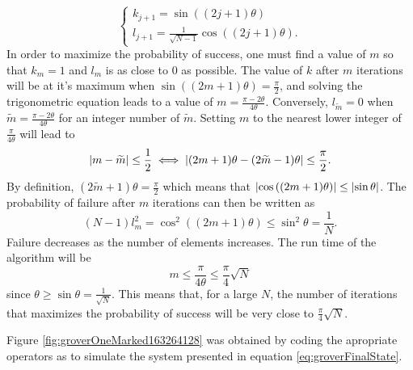 \documentclass[../../dissertation.tex]{subfiles}
\begin{document}
\begin{equation}
	\begin{cases}
		k_{j+1} = \sin{((2j+1)\theta)} 
		\\l_{j+1} = \frac{1}{\sqrt{N-1}}\cos{((2j+1)\theta)}.
	\end{cases}\label{eq:groverKandJ2}
\end{equation}
In order to maximize the probability of success, one must find a value of $m$ so that $k_m = 1$ and $l_m$ is as close to $0$ as possible. The value of $k$ after $m$ iterations will be at it's maximum when $\sin{((2m+1)\theta)} = \frac{\pi}{2}$, and solving the trigonometric equation leads to a value of $m = \frac{\pi-2\theta}{4\theta}$. Conversely, $l_{\widetilde{m}} = 0$ when $\widetilde{m} = \frac{\pi-2\theta}{4\theta}$ for an integer number of $\widetilde{m}$. Setting $m$ to the nearest lower integer of $\frac{\pi}{4\theta}$ will lead to
\begin{equation}
	\abs{m-\widetilde{m}} \leq \frac{1}{2} \iff \abs{(2m+1)\theta - (2\widetilde{m}-1)\theta} \leq \frac{\pi}{2}.
\end{equation}
By definition, $(2\widetilde{m}+1)\theta = \frac{\pi}{2}$ which means that $\abs{\cos{((2m+1)}\theta)} \leq \abs{\sin{\theta}}$. The probability of failure after $m$ iterations can then be written as
\begin{equation}
	(N-1)l_m^2 = \cos^2{((2m+1)\theta)} \leq \sin^2\theta = \frac{1}{N}.
\end{equation}
Failure decreases as the number of elements increases. The run time of the algorithm will be
\begin{equation}
	m \leq \frac{\pi}{4\theta} \leq \frac{\pi}{4}\sqrt{N}
\end{equation}
since $\theta \geq \sin\theta = \frac{1}{\sqrt{N}}$. This means that, for a large $N$, the number of iterations that maximizes the probability of success will be very close to $\frac{\pi}{4}\sqrt{N}$.\par
Figure \ref{fig:groverOneMarked163264128} was obtained by coding the apropriate operators as to simulate the system presented in equation \ref{eq:groverFinalState}. 
\end{document}
